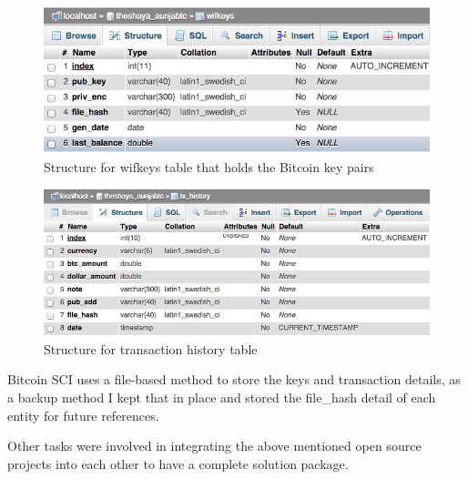 \begin{figure}[htb!p]
\centering
\includegraphics[scale=0.5]{fig/wifkeys_table.png}
  \caption{Structure for wifkeys table that holds the Bitcoin key pairs}
\label{fig:wifkeys}
\end{figure}

\begin{figure}[htb!p]
\centering
\includegraphics[scale=0.5]{fig/tx_history_table.png}
  \caption{Structure for transaction history table}
\label{fig:txhistory}
\end{figure}

Bitcoin SCI uses a file-based method to store the keys and transaction details, as a backup method I kept that in place and stored the file\_hash detail of each entity for future references.

Other tasks were involved in integrating the above mentioned open source projects into each other to have a complete solution package.


